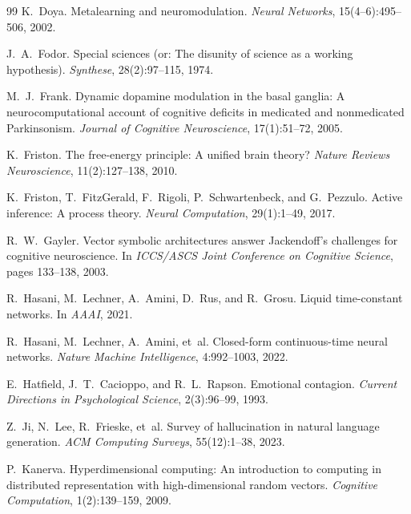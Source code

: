 \documentclass[12pt]{book}
\begin{document}
\begin{thebibliography}{99}
K.~Doya.
\newblock Metalearning and neuromodulation.
\newblock \textit{Neural Networks}, 15(4--6):495--506, 2002.

J.~A.~Fodor.
\newblock Special sciences (or: The disunity of science as a working hypothesis).
\newblock \textit{Synthese}, 28(2):97--115, 1974.

M.~J.~Frank.
\newblock Dynamic dopamine modulation in the basal ganglia: A neurocomputational account of cognitive deficits in medicated and nonmedicated Parkinsonism.
\newblock \textit{Journal of Cognitive Neuroscience}, 17(1):51--72, 2005.

K.~Friston.
\newblock The free-energy principle: A unified brain theory?
\newblock \textit{Nature Reviews Neuroscience}, 11(2):127--138, 2010.

K.~Friston, T.~FitzGerald, F.~Rigoli, P.~Schwartenbeck, and G.~Pezzulo.
\newblock Active inference: A process theory.
\newblock \textit{Neural Computation}, 29(1):1--49, 2017.

R.~W.~Gayler.
\newblock Vector symbolic architectures answer Jackendoff's challenges for cognitive neuroscience.
\newblock In \textit{ICCS/ASCS Joint Conference on Cognitive Science}, pages 133--138, 2003.

R.~Hasani, M.~Lechner, A.~Amini, D.~Rus, and R.~Grosu.
\newblock Liquid time-constant networks.
\newblock In \textit{AAAI}, 2021.

R.~Hasani, M.~Lechner, A.~Amini, et~al.
\newblock Closed-form continuous-time neural networks.
\newblock \textit{Nature Machine Intelligence}, 4:992--1003, 2022.

E.~Hatfield, J.~T.~Cacioppo, and R.~L.~Rapson.
\newblock Emotional contagion.
\newblock \textit{Current Directions in Psychological Science}, 2(3):96--99, 1993.

Z.~Ji, N.~Lee, R.~Frieske, et~al.
\newblock Survey of hallucination in natural language generation.
\newblock \textit{ACM Computing Surveys}, 55(12):1--38, 2023.

P.~Kanerva.
\newblock Hyperdimensional computing: An introduction to computing in distributed representation with high-dimensional random vectors.
\newblock \textit{Cognitive Computation}, 1(2):139--159, 2009.


\end{thebibliography}
\end{document}
